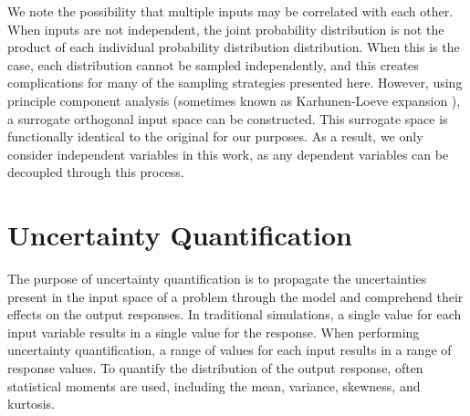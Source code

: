 We note the possibility that multiple inputs may be correlated with each other.  When inputs are not
independent, the joint probability distribution is not the product of each individual probability distribution
distribution.  When this is the case, each distribution cannot be sampled independently, and this
creates complications for many of the sampling strategies presented here.  However,
using principle component analysis (sometimes known as Karhunen-Loeve expansion
\cite{karhunen}), a surrogate orthogonal input space can be
constructed.  This surrogate space is functionally identical to the original for our purposes.
As a result, we only consider independent variables in this work, as any dependent variables can
be decoupled through this process.



\section{Uncertainty Quantification}
The purpose of uncertainty quantification is to propagate the uncertainties present in the input space of a
problem through the model and comprehend their effects on the output responses.  In traditional simulations, a
single value for each input variable results in a single value for the response.  When performing uncertainty
quantification, a range of values for each input results in a range of response values.  To quantify the
distribution of the output response, often statistical moments are used, including the mean, variance,
skewness, and kurtosis.
